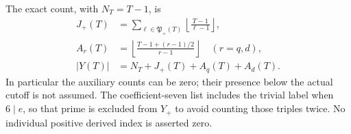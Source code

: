 \begin{theorem}
The exact count, with $N_T=T-1$, is
\[
 \begin{split}
 J_+(T)&=\sum_{\ell\in\mathfrak P_+(T)}
                      \left\lfloor\frac{T-1}{\ell-1}\right\rfloor,\\
 A_r(T)&=\left\lfloor
       \frac{T-1+(r-1)/2}{r-1}\right\rfloor\quad(r=q,d),\\
 |Y(T)|&=N_T+J_+(T)+A_q(T)+A_d(T).
 \end{split}                                                    \tag{RQM.7}
\]
In particular the auxiliary counts can be zero; their presence
below the actual cutoff is not assumed. The coefficient-seven
list includes the trivial label when $6\mid e$, so that prime is
excluded from $Y_+$ to avoid counting those triples twice.
No individual positive derived index is asserted zero.
\end{theorem}

